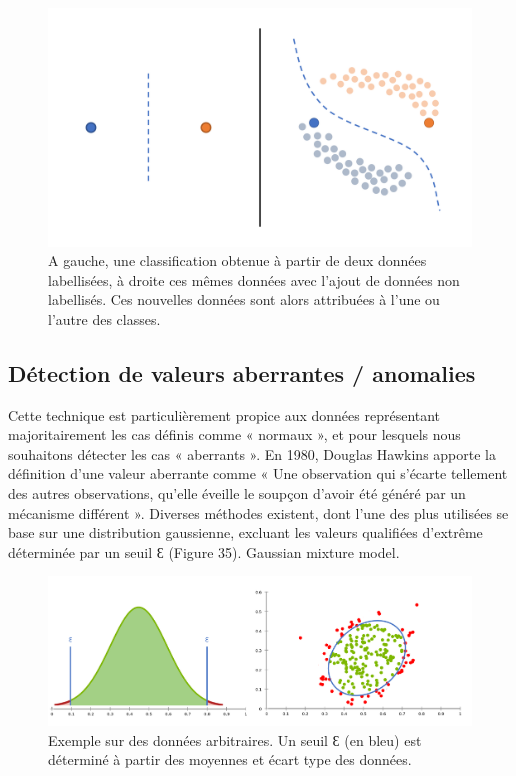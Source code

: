 \begin{figure}[H]
    \centering
    \includegraphics[width=\linewidth]{contents/chapter_3/resources/Semisupervised.pdf}
    \caption{A gauche, une classification obtenue à partir de deux données labellisées, à droite ces mêmes données avec l’ajout de données non labellisés. Ces nouvelles données sont alors attribuées à l’une ou l’autre des classes.}
    \label{fig:chapter_3:semisupervised}
\end{figure}

\subsection{Détection de valeurs aberrantes / anomalies}
Cette technique est particulièrement propice aux données représentant majoritairement les cas définis comme « normaux », et pour lesquels nous souhaitons détecter les cas « aberrants ». En 1980, Douglas Hawkins apporte la définition d’une valeur aberrante comme « Une observation qui s’écarte tellement des autres observations, qu’elle éveille le soupçon d’avoir été généré par un mécanisme différent ». Diverses méthodes existent, dont l’une des plus utilisées se base sur une distribution gaussienne, excluant les valeurs qualifiées d’extrême déterminée par un seuil Ɛ (Figure 35). Gaussian mixture model.
  
\begin{figure}[H]
    \centering
    \includegraphics[width=\linewidth]{contents/chapter_3/resources/AnomalyDetection.png}
    \caption{Exemple sur des données arbitraires. Un seuil Ɛ (en bleu) est déterminé à partir des moyennes et écart type des données.}
    \label{fig:chapter_3:anomaly}
\end{figure}

